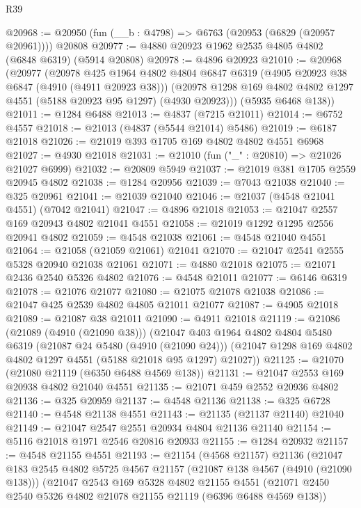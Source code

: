 \begin{lexlean}{R39}
\begin{coremodule}
@20968 := @20950 (fun (__b : @4798) => @6763 (@20953 (@6829 (@20957 @20961)))) @20808
@20977 := @4880 @20923 @1962 @2535 @4805 @4802 (@6848 @6319) (@5914 @20808)
@20978 := @4896 @20923
@21010 := @20968
    (@20977
      (@20978
        @425
        @1964
        @4802
        @4804
        @6847
        @6319
        (@4905 @20923 @38 @6847 (@4910 (@4911 @20923 @38)))
        (@20978 @1298 @169 @4802 @4802 @1297 @4551 (@5188 @20923 @95 @1297) (@4930 @20923)))
      (@5935 @6468 @138))
@21011 := @1284 @6488
@21013 := @4837 (@7215 @21011)
@21014 := @6752 @4557
@21018 := @21013 (@4837 (@5544 @21014) @5486)
@21019 := @6187 @21018
@21026 := @21019 @393 @1705 @169 @4802 @4802 @4551 @6968
@21027 := @4930 @21018
@21031 := @21010 (fun ("_" : @20810) => @21026 @21027 @6999)
@21032 := @20809 @5949
@21037 := @21019 @381 @1705 @2559 @20945 @4802
@21038 := @1284 @20956
@21039 := @7043 @21038
@21040 := @325 @20961
@21041 := @21039 @21040
@21046 := @21037 (@4548 @21041 @4551) (@7042 @21041)
@21047 := @4896 @21018
@21053 := @21047 @2557 @169 @20943 @4802 @21041 @4551
@21058 := @21019 @1292 @1295 @2556 @20941 @4802
@21059 := @4548 @21038
@21061 := @4548 @21040 @4551
@21064 := @21058 (@21059 @21061) @21041
@21070 := @21047 @2541 @2555 @5328 @20940 @21038 @21061
@21071 := @4880 @21018
@21075 := @21071 @2436 @2540 @5326 @4802
@21076 := @4548 @21011
@21077 := @6146 @6319
@21078 := @21076 @21077
@21080 := @21075 @21078 @21038
@21086 := @21047 @425 @2539 @4802 @4805 @21011 @21077
@21087 := @4905 @21018
@21089 := @21087 @38 @21011
@21090 := @4911 @21018
@21119 := @21086
    (@21089 (@4910 (@21090 @38)))
    (@21047
      @403
      @1964
      @4802
      @4804
      @5480
      @6319
      (@21087 @24 @5480 (@4910 (@21090 @24)))
      (@21047 @1298 @169 @4802 @4802 @1297 @4551 (@5188 @21018 @95 @1297) @21027))
@21125 := @21070 (@21080 @21119 (@6350 @6488 @4569 @138))
@21131 := @21047 @2553 @169 @20938 @4802 @21040 @4551
@21135 := @21071 @459 @2552 @20936 @4802
@21136 := @325 @20959
@21137 := @4548 @21136
@21138 := @325 @6728
@21140 := @4548 @21138 @4551
@21143 := @21135 (@21137 @21140) @21040
@21149 := @21047 @2547 @2551 @20934 @4804 @21136 @21140
@21154 := @5116 @21018 @1971 @2546 @20816 @20933
@21155 := @1284 @20932
@21157 := @4548 @21155 @4551
@21193 := @21154
    (@4568 @21157)
    @21136
    (@21047
      @183
      @2545
      @4802
      @5725
      @4567
      @21157
      (@21087 @138 @4567 (@4910 (@21090 @138)))
      (@21047
        @2543
        @169
        @5328
        @4802
        @21155
        @4551
        (@21071 @2450 @2540 @5326 @4802 @21078 @21155 @21119 (@6396 @6488 @4569 @138))

\end{coremodule}
\end{lexlean}
